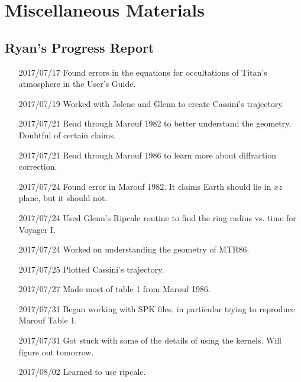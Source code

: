 \documentclass[crop=false,class=article,oneside]{standalone}
\begin{document}
    \ifx\ifphysicscourseselectromagnetismI\undefined
        \section*{Miscellaneous Materials}
        \setcounter{section}{1}
    \fi
    \subsection{Ryan's Progress Report}
        \begin{enumerate}[leftmargin=55pt]
            \item[2017/07/17] Found errors in the equations
                              for occultations of Titan's atmosphere
                              in the User's Guide.
            \item[2017/07/19] Worked with Jolene and Glenn
                              to create Cassini's trajectory.
            \item[2017/07/21] Read through Marouf 1982 to better
                              understand the geometry.
                              Doubtful of certain claims.
            \item[2017/07/21] Read through Marouf 1986 to learn more
                              about diffraction correction.
            \item[2017/07/24] Found error in Marouf 1982. It claims
                              Earth should lie in $xz$ plane,
                              but it should not.
            \item[2017/07/24] Used Glenn's Ripcalc routine to find the
                              ring radius vs. time for Voyager I.
            \item[2017/07/24] Worked on understanding the
                              geometry of MTR86.
            \item[2017/07/25] Plotted Cassini's trajectory.
            \item[2017/07/27] Made most of table 1 from Marouf 1986.
            \item[2017/07/31] Began working with SPK files,
                              in particular trying
                              to reproduce Marouf Table 1.
            \item[2017/07/31] Got stuck with some of the details
                              of using the
                              kernels. Will figure out tomorrow.
            \item[2017/08/02] Learned to use ripcalc.

\end{enumerate}
\end{document}
